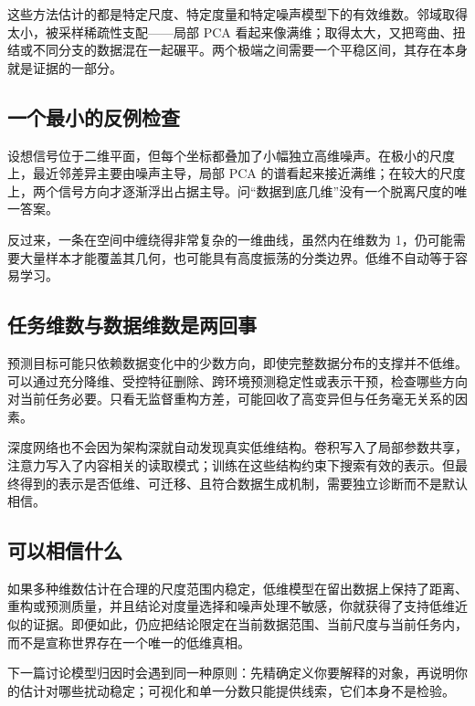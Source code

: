 这些方法估计的都是特定尺度、特定度量和特定噪声模型下的有效维数。邻域取得太小，被采样稀疏性支配——局部 PCA 看起来像满维；取得太大，又把弯曲、扭结或不同分支的数据混在一起碾平。两个极端之间需要一个平稳区间，其存在本身就是证据的一部分。

\subsection{一个最小的反例检查}

设想信号位于二维平面，但每个坐标都叠加了小幅独立高维噪声。在极小的尺度上，最近邻差异主要由噪声主导，局部 PCA 的谱看起来接近满维；在较大的尺度上，两个信号方向才逐渐浮出占据主导。问``数据到底几维''没有一个脱离尺度的唯一答案。

反过来，一条在空间中缠绕得非常复杂的一维曲线，虽然内在维数为 1，仍可能需要大量样本才能覆盖其几何，也可能具有高度振荡的分类边界。低维不自动等于容易学习。

\subsection{任务维数与数据维数是两回事}

预测目标可能只依赖数据变化中的少数方向，即使完整数据分布的支撑并不低维。可以通过充分降维、受控特征删除、跨环境预测稳定性或表示干预，检查哪些方向对当前任务必要。只看无监督重构方差，可能回收了高变异但与任务毫无关系的因素。

深度网络也不会因为架构深就自动发现真实低维结构。卷积写入了局部参数共享，注意力写入了内容相关的读取模式；训练在这些结构约束下搜索有效的表示。但最终得到的表示是否低维、可迁移、且符合数据生成机制，需要独立诊断而不是默认相信。

\subsection{可以相信什么}

如果多种维数估计在合理的尺度范围内稳定，低维模型在留出数据上保持了距离、重构或预测质量，并且结论对度量选择和噪声处理不敏感，你就获得了支持低维近似的证据。即便如此，仍应把结论限定在当前数据范围、当前尺度与当前任务内，而不是宣称世界存在一个唯一的低维真相。

下一篇讨论模型归因时会遇到同一种原则：先精确定义你要解释的对象，再说明你的估计对哪些扰动稳定；可视化和单一分数只能提供线索，它们本身不是检验。
